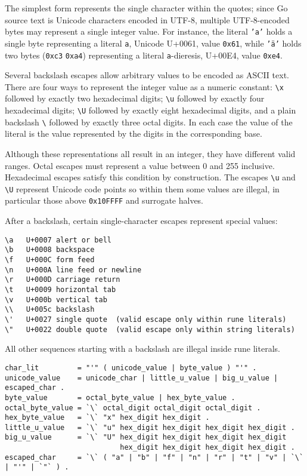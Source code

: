 The simplest form represents the single character within the quotes;
since Go source text is Unicode characters encoded in UTF-8, multiple
UTF-8-encoded bytes may represent a single integer value. For instance,
the literal \texttt{'a'} holds a single byte representing a literal
\texttt{a}, Unicode U+0061, value \texttt{0x61}, while \texttt{'ä'}
holds two bytes (\texttt{0xc3} \texttt{0xa4}) representing a literal
\texttt{a}-dieresis, U+00E4, value \texttt{0xe4}.

Several backslash escapes allow arbitrary values to be encoded as ASCII
text. There are four ways to represent the integer value as a numeric
constant: \texttt{\textbackslash{}x} followed by exactly two hexadecimal
digits; \texttt{\textbackslash{}u} followed by exactly four hexadecimal
digits; \texttt{\textbackslash{}U} followed by exactly eight hexadecimal
digits, and a plain backslash \texttt{\textbackslash{}} followed by
exactly three octal digits. In each case the value of the literal is the
value represented by the digits in the corresponding base.

Although these representations all result in an integer, they have
different valid ranges. Octal escapes must represent a value between 0
and 255 inclusive. Hexadecimal escapes satisfy this condition by
construction. The escapes \texttt{\textbackslash{}u} and
\texttt{\textbackslash{}U} represent Unicode code points so within them
some values are illegal, in particular those above \texttt{0x10FFFF} and
surrogate halves.

After a backslash, certain single-character escapes represent special
values:

\begin{Verbatim}[frame=single]
\a   U+0007 alert or bell
\b   U+0008 backspace
\f   U+000C form feed
\n   U+000A line feed or newline
\r   U+000D carriage return
\t   U+0009 horizontal tab
\v   U+000b vertical tab
\\   U+005c backslash
\'   U+0027 single quote  (valid escape only within rune literals)
\"   U+0022 double quote  (valid escape only within string literals)
\end{Verbatim}

All other sequences starting with a backslash are illegal inside rune
literals.

\begin{Verbatim}[frame=single]
char_lit         = "'" ( unicode_value | byte_value ) "'" .
unicode_value    = unicode_char | little_u_value | big_u_value | escaped_char .
byte_value       = octal_byte_value | hex_byte_value .
octal_byte_value = `\` octal_digit octal_digit octal_digit .
hex_byte_value   = `\` "x" hex_digit hex_digit .
little_u_value   = `\` "u" hex_digit hex_digit hex_digit hex_digit .
big_u_value      = `\` "U" hex_digit hex_digit hex_digit hex_digit
                           hex_digit hex_digit hex_digit hex_digit .
escaped_char     = `\` ( "a" | "b" | "f" | "n" | "r" | "t" | "v" | `\` | "'" | `"` ) .
\end{Verbatim}

